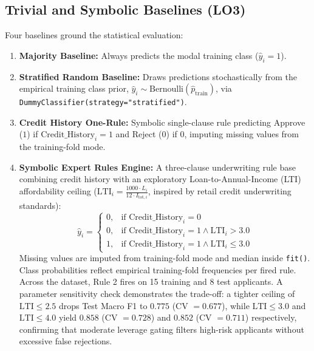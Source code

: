 \documentclass{COMPXXXX}
\begin{document}
\subsection{Trivial and Symbolic Baselines (LO3)}
Four baselines ground the statistical evaluation:
\begin{enumerate}
    \item \textbf{Majority Baseline:} Always predicts the modal training class ($\hat{y}_i = 1$).
    \item \textbf{Stratified Random Baseline:} Draws predictions stochastically from the empirical training class prior, $\hat{y}_i \sim \text{Bernoulli}(\hat{p}_{\text{train}})$, via \texttt{DummyClassifier(strategy="stratified")}.
    \item \textbf{Credit History One-Rule:} Symbolic single-clause rule predicting Approve ($1$) if $\text{Credit\_History}_i = 1$ and Reject ($0$) if $0$, imputing missing values from the training-fold mode.
    \item \textbf{Symbolic Expert Rules Engine:} A three-clause underwriting rule base combining credit history with an exploratory Loan-to-Annual-Income (LTI) affordability ceiling ($\text{LTI}_i = \frac{1000 \cdot L_i}{12 \cdot I_{\text{tot},i}}$, inspired by retail credit underwriting standards):
    \begin{equation}
    \hat{y}_i = \begin{cases}
    0, & \text{if } \text{Credit\_History}_i = 0 \\
    0, & \text{if } \text{Credit\_History}_i = 1 \wedge \text{LTI}_i > 3.0 \\
    1, & \text{if } \text{Credit\_History}_i = 1 \wedge \text{LTI}_i \le 3.0
    \end{cases}
    \end{equation}
    Missing values are imputed from training-fold mode and median inside \texttt{fit()}. Class probabilities reflect empirical training-fold frequencies per fired rule. Across the dataset, Rule 2 fires on 15 training and 8 test applicants. A parameter sensitivity check demonstrates the trade-off: a tighter ceiling of $\text{LTI} \le 2.5$ drops Test Macro F1 to $0.775$ (CV $= 0.677$), while $\text{LTI} \le 3.0$ and $\text{LTI} \le 4.0$ yield $0.858$ (CV $= 0.728$) and $0.852$ (CV $= 0.711$) respectively, confirming that moderate leverage gating filters high-risk applicants without excessive false rejections.
\end{enumerate}
\end{document}
